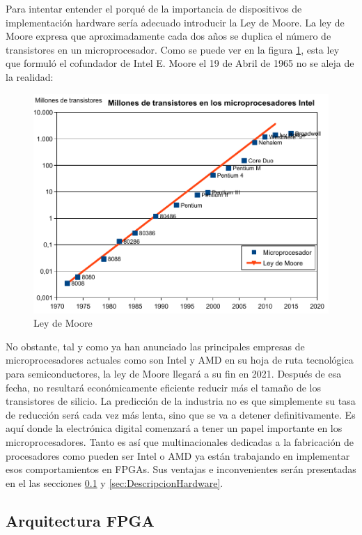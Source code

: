 Para intentar entender el porqué de la importancia de dispositivos de implementación hardware sería adecuado introducir la Ley de Moore. La ley de Moore expresa que aproximadamente cada dos años se duplica el número de transistores en un microprocesador. Como se puede ver en la figura \ref{fig:Ley_de_Moore}, esta ley que formuló el cofundador de Intel E. Moore el 19 de Abril de 1965 no se aleja de la realidad: 
\newline
\begin{figure}[H]
	\center
	\includegraphics[scale=0.7]{imagenes/EstadoArte/ley_moore-eps-converted-to.pdf}
	\caption{Ley de Moore}
	\label{fig:Ley_de_Moore}
\end{figure}
 

No obstante, tal y como ya han anunciado las principales empresas de microprocesadores actuales como son Intel y AMD en su hoja de ruta tecnológica para semiconductores, la ley de Moore llegará a su fin en 2021. Después de esa fecha, no resultará económicamente eficiente reducir más el tamaño de los transistores de silicio. La predicción de la industria no es que simplemente su tasa de reducción será cada vez más lenta, sino que se va a detener definitivamente. Es aquí donde la electrónica digital comenzará a tener un papel importante en los microprocesadores. Tanto es así que multinacionales dedicadas a la fabricación de procesadores como pueden ser Intel o AMD ya están trabajando en implementar esos comportamientos en FPGAs. Sus ventajas e inconvenientes serán presentadas en el las secciones \ref{sec:ArquitecturaFPGA} y \ref{sec:DescripcionHardware}.

\subsection{Arquitectura FPGA}\label{sec:ArquitecturaFPGA}

